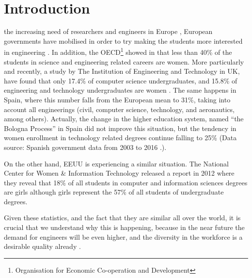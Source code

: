 \documentclass[journal,transmag]{IEEEtran}
\begin{document}
%
\IEEEpeerreviewmaketitle

\section{Introduction}
\label{sec:intro}

 the increasing need of researchers and engineers in Europe \cite{gago2004europe}, European governments have mobilised in order to try making the students more interested in engineering \cite{Kearney2014}. In addition, the OECD\footnote{Organisation for Economic Co-operation and Development} showed in \cite{OECD2006} that less than 40\% of the students in science and engineering related careers are women. More particularly and recently, a study by The Institution of Engineering and Technology in UK, have found that only 17.4\% of computer science undergraduates, and 15.8\% of engineering and technology undergraduates are women \cite{IET::stats}. The same happens in Spain, where this number falls from the European mean to 31\%, taking into account all engineerings (civil, computer science, technology, and aeronautics, among others). Actually, the change in the higher education system, named ``the Bologna Process'' in Spain \cite{wagenaar2008universities} did not improve this situation, but the tendency in women enrollment in technology related degrees continue falling to 25\% (Data source: Spanish government data from 2003 to 2016 \cite{datos::uni}.).

On the other hand, EEUU is experiencing a similar situation. The National Center for Women \& Information Technology released a report in 2012 \cite{NCWIT::stats} where they reveal that 18\% of all students in computer and information sciences degrees are girls although girls represent the 57\% of all students of undergraduate degrees.

Given these statistics, and the fact that they are similar all over the world, it is crucial that we understand why this is happening, because in the near future the demand for engineers will be even higher, and the diversity in the workforce is a desirable quality already \cite{wilson1992benefits}. 
\end{document}
